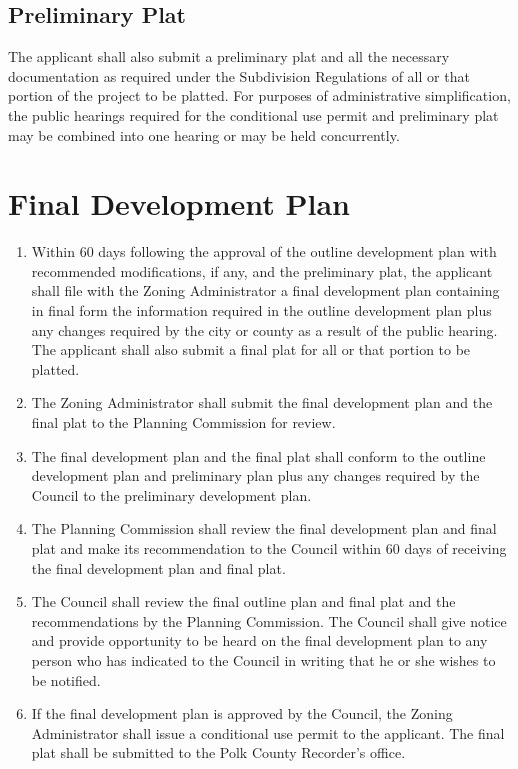 \subsection{Preliminary Plat}
The applicant shall also submit a preliminary plat and all the necessary documentation as required under the Subdivision Regulations of all or that portion of the project to be platted.  For purposes of administrative simplification, the public hearings required for the conditional use permit and preliminary plat may be combined into one hearing or may be held concurrently.

\section{Final Development Plan}
\begin{enumerate}[{\indent}A)]
    \item Within 60 days following the approval of the outline development plan with recommended modifications, if any, and the preliminary plat, the applicant shall file with the Zoning Administrator a final development plan containing in final form the information required in the outline development plan plus any changes required by the city or county as a result of the public hearing. The applicant shall also submit a final plat for all or that portion to be platted.
    \item The Zoning Administrator shall submit the final development plan and the final plat to the Planning Commission for review.
    \item The final development plan and the final plat shall conform to the outline development plan and preliminary plan plus any changes required by the Council to the preliminary development plan.
    \item The Planning Commission shall review the final development plan and final plat and make its recommendation to the Council within 60 days of receiving the final development plan and final plat.
    \item The Council shall review the final outline plan and final plat and the recommendations by the Planning Commission. The Council shall give notice and provide opportunity to be heard on the final development plan to any person who has indicated to the Council in writing that he or she wishes to be notified.
    \item If the final development plan is approved by the Council, the Zoning Administrator shall issue a conditional use permit to the applicant. The final plat shall be submitted to the Polk County Recorder’s office.
\end{enumerate}

